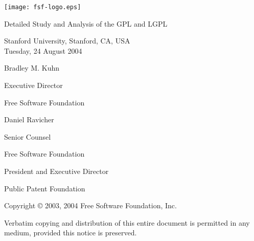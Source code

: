 \documentclass[11pt, letterpaper]{book}
\begin{document}
\frontmatter

\begin{titlepage}

\begin{center}

\vfill

\texttt{[image: fsf-logo.eps]}

\vfill

{\Large
{\sc Detailed Study and Analysis of the GPL and LGPL  } \\

\vfill





Stanford University, Stanford, CA, USA \\
\vspace{.1in}
Tuesday, 24 August 2004
}

\vfill

{\large
Bradley M. Kuhn

Executive Director

Free Software Foundation
}

\vspace{.3in}


{\large
Daniel Ravicher

Senior Counsel 

Free Software Foundation

President and Executive Director

Public Patent Foundation

}

\end{center}

\vfill

{\parindent 0in
Copyright \copyright{} 2003, 2004 \hspace{.2in} Free Software Foundation, Inc.

\vspace{.3in}

Verbatim copying and distribution of this entire document is permitted in
any medium, provided this notice is preserved.
}

\end{titlepage}

\pagestyle{plain}
\end{document}
